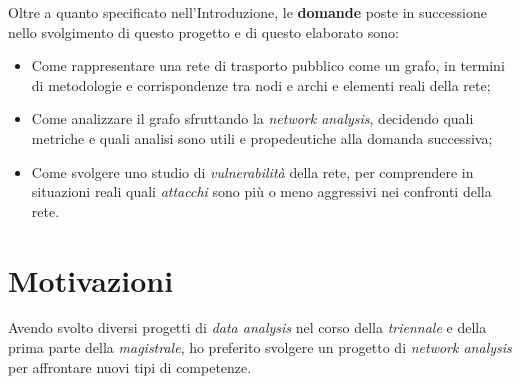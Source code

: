 Oltre a quanto specificato nell'Introduzione, le \textbf{domande} poste in successione nello svolgimento di questo progetto e di questo elaborato sono:
\begin{itemize}
    \item Come rappresentare una rete di trasporto pubblico come un grafo, in termini di metodologie e corrispondenze tra nodi e archi e elementi reali della rete;
    \item Come analizzare il grafo sfruttando la \textit{network analysis}, decidendo quali metriche e quali analisi sono utili e propedeutiche alla domanda successiva;
    \item Come svolgere uno studio di \textit{vulnerabilità} della rete, per comprendere in situazioni reali quali \textit{attacchi} sono più o meno aggressivi nei confronti della rete.
\end{itemize}

\section*{Motivazioni}
Avendo svolto diversi progetti di \textit{data analysis} nel corso della \textit{triennale} e della prima parte della \textit{magistrale}, ho preferito svolgere un progetto di \textit{network analysis} per affrontare nuovi tipi di competenze.